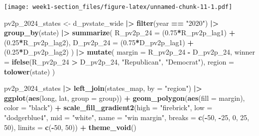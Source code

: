 \documentclass[
]{article}
\newenvironment{Shaded}{\begin{snugshade}}{\end{snugshade}}
\newcommand{\AttributeTok}[1]{\textcolor[rgb]{0.13,0.29,0.53}{#1}}
\newcommand{\DecValTok}[1]{\textcolor[rgb]{0.00,0.00,0.81}{#1}}
\newcommand{\FloatTok}[1]{\textcolor[rgb]{0.00,0.00,0.81}{#1}}
\newcommand{\FunctionTok}[1]{\textcolor[rgb]{0.13,0.29,0.53}{\textbf{#1}}}
\newcommand{\NormalTok}[1]{#1}
\newcommand{\OtherTok}[1]{\textcolor[rgb]{0.56,0.35,0.01}{#1}}
\newcommand{\SpecialCharTok}[1]{\textcolor[rgb]{0.81,0.36,0.00}{\textbf{#1}}}
\newcommand{\StringTok}[1]{\textcolor[rgb]{0.31,0.60,0.02}{#1}}
\begin{document}
\texttt{[image: week1-section\_files/figure-latex/unnamed-chunk-11-1.pdf]}

\begin{Shaded}
\begin{Highlighting}[]
\NormalTok{pv2p\_2024\_states }\OtherTok{\textless{}{-}}\NormalTok{ d\_pvstate\_wide }\SpecialCharTok{|\textgreater{}}
  \FunctionTok{filter}\NormalTok{(year }\SpecialCharTok{==} \StringTok{"2020"}\NormalTok{) }\SpecialCharTok{|\textgreater{}}
  \FunctionTok{group\_by}\NormalTok{(state) }\SpecialCharTok{|\textgreater{}}
  \FunctionTok{summarize}\NormalTok{(}
    \AttributeTok{R\_pv2p\_24 =}\NormalTok{ (}\FloatTok{0.75}\SpecialCharTok{*}\NormalTok{R\_pv2p\_lag1) }\SpecialCharTok{+}\NormalTok{ (}\FloatTok{0.25}\SpecialCharTok{*}\NormalTok{R\_pv2p\_lag2),}
    \AttributeTok{D\_pv2p\_24 =}\NormalTok{ (}\FloatTok{0.75}\SpecialCharTok{*}\NormalTok{D\_pv2p\_lag1) }\SpecialCharTok{+}\NormalTok{ (}\FloatTok{0.25}\SpecialCharTok{*}\NormalTok{D\_pv2p\_lag2)}
\NormalTok{  ) }\SpecialCharTok{|\textgreater{}}
  \FunctionTok{mutate}\NormalTok{(}
    \AttributeTok{margin =}\NormalTok{ R\_pv2p\_24 }\SpecialCharTok{{-}}\NormalTok{ D\_pv2p\_24,}
    \AttributeTok{winner =} \FunctionTok{ifelse}\NormalTok{(R\_pv2p\_24 }\SpecialCharTok{\textgreater{}}\NormalTok{ D\_pv2p\_24, }\StringTok{"Republican"}\NormalTok{, }\StringTok{"Democrat"}\NormalTok{),}
    \AttributeTok{region =} \FunctionTok{tolower}\NormalTok{(state)}
\NormalTok{  )}
\end{Highlighting}
\end{Shaded}

\begin{Shaded}
\begin{Highlighting}[]
\NormalTok{pv2p\_2024\_states }\SpecialCharTok{|\textgreater{}}
  \FunctionTok{left\_join}\NormalTok{(states\_map, }\AttributeTok{by =} \StringTok{"region"}\NormalTok{) }\SpecialCharTok{|\textgreater{}}
  \FunctionTok{ggplot}\NormalTok{(}\FunctionTok{aes}\NormalTok{(long, lat, }\AttributeTok{group =}\NormalTok{ group)) }\SpecialCharTok{+}
  \FunctionTok{geom\_polygon}\NormalTok{(}\FunctionTok{aes}\NormalTok{(}\AttributeTok{fill =}\NormalTok{ margin), }\AttributeTok{color =} \StringTok{"black"}\NormalTok{) }\SpecialCharTok{+}
  \FunctionTok{scale\_fill\_gradient2}\NormalTok{(}\AttributeTok{high =} \StringTok{"firebrick"}\NormalTok{, }
                       \AttributeTok{low =} \StringTok{"dodgerblue4"}\NormalTok{, }
                       \AttributeTok{mid =} \StringTok{"white"}\NormalTok{,}
                       \AttributeTok{name =} \StringTok{"win margin"}\NormalTok{,}
                       \AttributeTok{breaks =} \FunctionTok{c}\NormalTok{(}\SpecialCharTok{{-}}\DecValTok{50}\NormalTok{, }\SpecialCharTok{{-}}\DecValTok{25}\NormalTok{, }\DecValTok{0}\NormalTok{, }\DecValTok{25}\NormalTok{, }\DecValTok{50}\NormalTok{),}
                       \AttributeTok{limits =} \FunctionTok{c}\NormalTok{(}\SpecialCharTok{{-}}\DecValTok{50}\NormalTok{, }\DecValTok{50}\NormalTok{)) }\SpecialCharTok{+}
  \FunctionTok{theme\_void}\NormalTok{()}
\end{Highlighting}
\end{Shaded}
\end{document}
